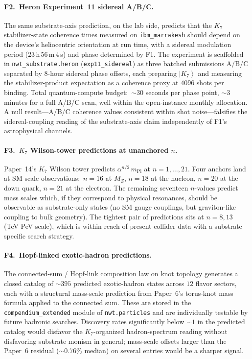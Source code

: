 \documentclass[11pt]{article}
\newcommand{\ket}[1]{\left|#1\right\rangle}
\newcommand{\mPl}{m_{\mathrm{Pl}}}
\begin{document}
\paragraph{F2.\ Heron Experiment~11 sidereal A/B/C.}  The same
substrate-axis prediction, on the lab side, predicts that the
$K_7$ stabilizer-state coherence times measured on
\texttt{ibm\_marrakesh} should depend on the device's heliocentric
orientation at run time, with a sidereal modulation period
($23$\,h\,$56$\,m\,$4$\,s) and phase determined by F1.  The
experiment is scaffolded in \texttt{nwt\_substrate.heron}
(\texttt{exp11\_sidereal}) as three batched submissions A/B/C
separated by $8$-hour sidereal phase offsets, each preparing
$\ket{K_7}$ and measuring the stabilizer-product expectation as
a coherence proxy at $4096$ shots per binding.  Total
quantum-compute budget:\ $\sim 30$ seconds per phase point,
$\sim 3$ minutes for a full A/B/C scan, well within the
open-instance monthly allocation.  A null result---A/B/C
coherence values consistent within shot noise---falsifies the
sidereal-coupling reading of the substrate-axis claim
independently of F1's astrophysical channels.

\paragraph{F3.\ $K_7$ Wilson-tower predictions at unanchored
$n$.}  Paper~14's $K_7$ Wilson tower predicts $\alpha^{n/2}\,\mPl$
at $n = 1, \ldots, 21$.  Four anchors land at SM-scale
observations:\ $n = 16$ at $M_Z$, $n = 18$ at the nucleon, $n =
20$ at the down quark, $n = 21$ at the electron.  The remaining
seventeen $n$-values predict mass scales which, if they
correspond to physical resonances, should be observable as
substrate-only states (no SM gauge couplings, but graviton-like
coupling to bulk geometry).  The tightest pair of predictions
sits at $n = 8, 13$ (TeV-PeV scale), which is within reach of
present collider data with a substrate-specific search strategy.

\paragraph{F4.\ Hopf-linked exotic-hadron predictions.}  The
connected-sum / Hopf-link composition law on knot topology
generates a closed catalog of $\sim 395$ predicted exotic-hadron
states across $12$ flavor sectors, each with a structural
mass-scale prediction from Paper~6's torus-knot mass formula
applied to the connected sum.  These are stored in the
\texttt{compendium\_extended} module of \texttt{nwt.particles}
and are individually testable by future hadronic searches.  Discovery rates
significantly below $\sim 1$ in the predicted catalog would
disfavor the $K_7$-organized hadron-spectrum reading without
disfavoring substrate monism in general; mass-scale offsets
larger than the Paper~6 residual ($\sim 0.76\%$ median) on
several entries would be a sharper signal.
\end{document}
